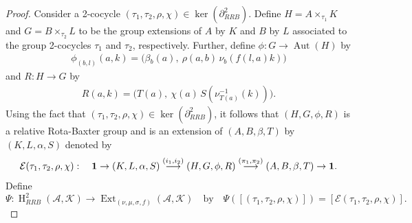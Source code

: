 \documentclass[11pt]{amsart}
\theoremstyle{thrm}
\theoremstyle{plain}
\theoremstyle{definition}
\newcommand{\Ho}{\operatorname{H} }
\newcommand{\Aut}{\operatorname{Aut} }
\newcommand{\Ext}{\operatorname{Ext} }
\newcommand{\Ker}{\operatorname{ker} }
\numberwithin{equation}{section}
\begin{document}
\begin{proof}
Consider a 2-cocycle $(\tau_1, \tau_2, \rho, \chi) \in \Ker(\partial_{RRB}^2)$. Define $H=A\times_{\tau_1} K$ and $G= B \times_{\tau_2} L$ to be the group extensions of $A$ by $K$ and $B$ by $L$ associated to the group 2-cocycles $\tau_1$ and $\tau_2$, respectively. Further, define $\phi: G \rightarrow \Aut(H)$ by 
\begin{align}
\phi_{(b,l)}(a,k)=\big(\beta{_{b}(a)}, ~\rho(a,b) \,\nu_b(f(l,a)k)\big)
\end{align} 
and $R: H \rightarrow G$ by 
\begin{align}
R(a,k)=\big(T(a), ~\chi(a)\,S(\nu^{-1}_{T(a)}(k))\big).
\end{align}
Using the fact that $(\tau_1, \tau_2, \rho, \chi) \in \Ker(\partial_{RRB}^2)$, it follows that $(H, G, \phi, R)$ is a relative Rota-Baxter group and is an extension of  $(A,B, \beta, T)$ by  $(K,L, \alpha,S )$ denoted by 
$$\mathcal{E}(\tau_1, \tau_2, \rho, \chi) : \quad {\bf 1} \to (K,L, \alpha,S ) \stackrel{(i_1, i_2)}{\longrightarrow}  (H, G, \phi, R) \stackrel{(\pi_1, \pi_2)}{\longrightarrow} (A,B, \beta, T) \to {\bf 1}.$$
Define 
$$\Psi:  \Ho^2_{RRB}(\mathcal{A}, \mathcal{K}) \longrightarrow \Ext_{(\nu, \mu, \sigma, f)}(\mathcal{A}, \mathcal{K}) \quad \textrm{by} \quad \Psi([(\tau_1, \tau_2, \rho, \chi)])=[\mathcal{E}(\tau_1, \tau_2, \rho, \chi)].$$


\end{proof}
\end{document}
